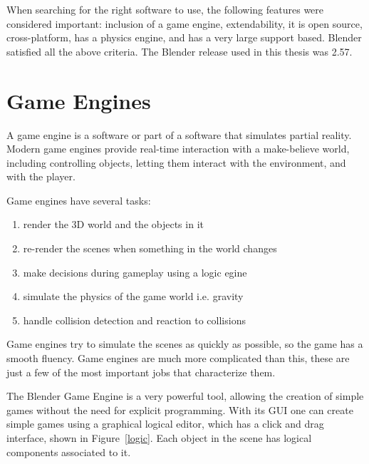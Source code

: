 When searching for the right software to use, the following features were considered important: inclusion of a game engine, extendability, it is open source, cross-platform, has a physics engine, and has a very large support based. Blender satisfied all the above criteria. 
The Blender release used in this thesis was 2.57.

\section{Game Engines}

A game engine is a software or part of a software that simulates partial reality\cite{bookGameKit2}. Modern game engines provide real-time interaction with a make-believe world, including controlling objects, letting them interact with 
the environment, and with the player. 

Game engines have several tasks:
\begin{enumerate}
\item{render the 3D world and the objects in it}
\item{re-render the scenes when something in the world changes}
\item{make decisions during gameplay using a logic egine}
\item{simulate the physics of the game world i.e. gravity}
\item{handle collision detection and reaction to collisions}
\end{enumerate}

Game engines try to simulate the scenes as quickly as possible, so the game has a smooth fluency. Game engines are much more complicated than this, these are just a few of the most important jobs that characterize them.

The Blender Game Engine is a very powerful tool, allowing the creation of simple games without  the need for explicit programming. With its GUI one can create simple games using a graphical logical editor, which has a click and drag interface, shown in Figure~\ref{logic}. 
Each object in the scene has logical components associated to it. 

